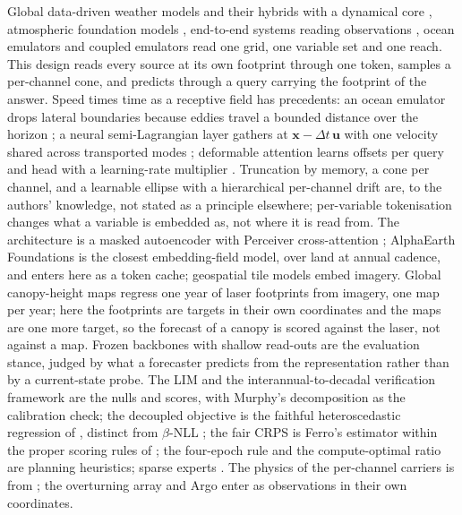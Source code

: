 \documentclass[10pt]{article}
\begin{document}
Global data-driven weather models \cite{pangu,graphcast,aifs,fgn} and their
hybrids with a dynamical core \cite{neuralgcm}, atmospheric foundation
models \cite{aurora,climax}, end-to-end systems reading observations
\cite{aardvark}, ocean emulators \cite{samudra,oceannet} and coupled
emulators \cite{ace2} read one grid, one variable set and one reach. This
design reads every source at its own footprint through one token, samples a
per-channel cone, and predicts through a query carrying the footprint of
the answer. Speed times time as a receptive field has precedents: an ocean
emulator drops lateral boundaries because eddies travel a bounded distance
over the horizon \cite{oceannet}; a neural semi-Lagrangian layer gathers at
$\mathbf{x}-\Delta t\,\mathbf{u}$ with one velocity shared across
transported modes \cite{paradis}; deformable attention learns offsets per
query and head with a learning-rate multiplier \cite{deformable}. Truncation
by memory, a cone per channel, and a learnable ellipse with a hierarchical
per-channel drift are, to the authors' knowledge, not stated as a principle
elsewhere; per-variable tokenisation \cite{aurora,climax} changes what a
variable is embedded as, not where it is read from. The architecture is a
masked autoencoder \cite{mae} with Perceiver cross-attention
\cite{perceiver}; AlphaEarth Foundations \cite{alphaearth} is the closest
embedding-field model, over land at annual cadence, and enters here as a
token cache; geospatial tile models \cite{prithvi} embed imagery. Global
canopy-height maps \cite{potapov,lang,tolan} regress one year of laser
footprints from imagery, one map per year; here the footprints are targets
in their own coordinates and the maps are one more target, so the forecast
of a canopy is scored against the laser, not against a map. Frozen
backbones with shallow read-outs \cite{lehmann} are the evaluation stance,
judged by what a forecaster predicts from the representation rather than by
a current-state probe. The LIM \cite{penland,newman} and the
interannual-to-decadal verification framework \cite{goddard} are the nulls
and scores, with Murphy's decomposition \cite{murphy} as the calibration
check; the decoupled objective is the faithful heteroscedastic regression of
\cite{faithful}, distinct from $\beta$-NLL \cite{betanll}; the fair CRPS is
Ferro's estimator \cite{ferro2008,ferro2014,leutbecher} within the proper
scoring rules of \cite{crps}; the four-epoch rule \cite{datacon} and the
compute-optimal ratio \cite{chinchilla} are planning heuristics; sparse
experts \cite{switch}. The physics of the per-channel carriers is from
\cite{chelton,thorndike,sutton,meinen}; the overturning array
\cite{mccarthy2015} and Argo \cite{argo} enter as observations in their own
coordinates.
\end{document}
